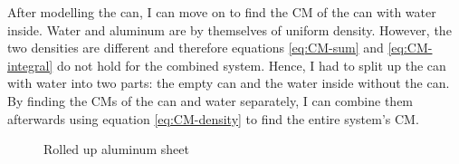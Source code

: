\documentclass[11pt]{article}
\begin{document}
    After modelling the can, I can move on to find the CM of the can with water inside. Water and aluminum are by themselves of uniform density. However, the two densities are different and therefore equations \eqref{eq:CM-sum} and \eqref{eq:CM-integral} do not hold for the combined system. Hence, I had to split up the can with water into two parts: the empty can and the water inside without the can. By finding the CMs of the can and water separately, I can combine them afterwards using equation \eqref{eq:CM-density} to find the entire system's CM.

    \begin{figure}
        \centering
        \vspace{-10pt}
        \caption{Rolled up aluminum sheet}
        \label{fig:aluminum-sheet}
    \end{figure}
\end{document}

